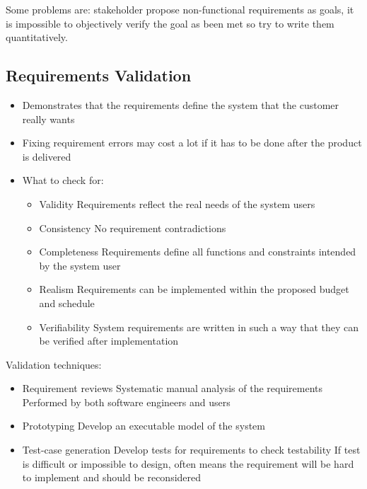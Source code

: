 \documentclass{article}
\begin{document}
    Some problems are: stakeholder propose non-functional requirements as goals, it is 
    impossible to objectively verify the goal as been met so try to write them 
    quantitatively.

    \subsection*{Requirements Validation}

    \begin{itemize}
        \item 
        Demonstrates that the requirements define the system that the customer really wants
        \item
        Fixing requirement errors may cost a lot if it has to be done after the product is delivered
        \item
        What to check for:
        \begin{itemize}
            \item 
            Validity
            Requirements reflect the real needs of the system users
            \item
            Consistency
            No requirement contradictions
            \item
            Completeness
            Requirements define all functions and constraints intended by the system user
            \item
            Realism
            Requirements can be implemented within the proposed budget and schedule
            \item
            Verifiability
            System requirements are written in such a way that they can be verified after implementation
        \end{itemize}
    \end{itemize}

    Validation techniques:
    \begin{itemize}
        \item 
        Requirement reviews
        Systematic manual analysis of the requirements
        Performed by both software engineers and users
        \item
        Prototyping
        Develop an executable model of the system
        \item
        Test-case generation
        Develop tests for requirements to check testability
        If test is difficult or impossible to design, often means the requirement will be hard to implement and should be reconsidered
    \end{itemize}
\end{document}

